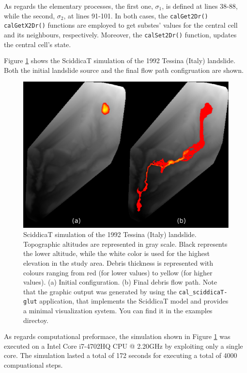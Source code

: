 As regards the elementary processes, the first one, $\sigma_1$, is
defined at lines 38-88, while the second, $\sigma_2$, at lines
91-101. In both cases, the \verb'calGet2Dr()' \verb'calGetX2Dr()'
functions are employed to get substes' values for the central cell and
its neighbours, respectively. Moreover, the \verb'calSet2Dr()'
function, updates the central cell's state.

Figure \ref{fig:sciddicaT} shows the SciddicaT simulation of the 1992
Tessina (Italy) landslide. Both the initial landslide source and the
final flow path configruation are shown.

\begin{figure}[htbp]
  \centering
  \includegraphics[width=12cm]{./images/OpenCAL/sciddicaT}
  \caption{SciddicaT simulation of the 1992 Tessina (Italy)
    landslide. Topographic altitudes are represented in gray
    scale. Black represents the lower altitude, while the white color
    is used for the highest elevation in the study area. Debris
    thickness is represented with colours ranging from red (for lower
    values) to yellow (for higher values). (a) Initial
    configuration. (b) Final debris flow path. Note that the graphic
    output was generated by using the \texttt{cal\_sciddicaT-glut}
    application, that implements the SciddicaT model and provides a
    minimal visualization system. You can find it in the examples
    directoy.}
  \label{fig:sciddicaT}
\end{figure}

As regards computational preformace, the simulation shown in Figure
\ref{fig:sciddicaT} was executed on a Intel Core i7-4702HQ CPU @
2.20GHz by exploiting only a single core. The simulation lasted a
total of 172 seconds for executing a total of 4000 compuational steps.

